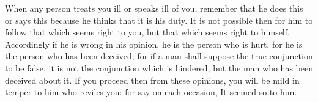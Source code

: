 When any person treats you ill or speaks ill of you, remember that he does this
or says this because he thinks that it is his duty. It is not possible then for
him to  follow that which  seems right  to you, but  that which seems  right to
himself. Accordingly  if he is wrong  in his opinion,  he is the person  who is
hurt, for he  is the person who has  been deceived; for if a  man shall suppose
the true conjunction to be false, it  is not the conjunction which is hindered,
but the  man who has  been deceived  about it. If  you proceed then  from these
opinions, you will  be mild in temper to  him who reviles you: for  say on each
occasion, It seemed so to him.
